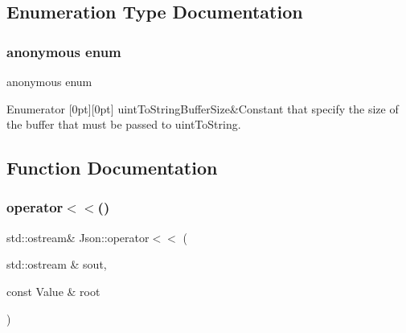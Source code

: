 \subsection{Enumeration Type Documentation}
\mbox{\label{namespace_json_a0c5f614b019f20b4598dcaec09d9e820}} 
\subsubsection{\texorpdfstring{anonymous enum}{anonymous enum}}
{\footnotesize\ttfamily anonymous enum}

\begin{DoxyEnumFields}{Enumerator}
[0pt][0pt]{}\mbox{\label{namespace_json_a0c5f614b019f20b4598dcaec09d9e820ae4f2008c7919f20d81286121d1374424}} 
uint\+To\+String\+Buffer\+Size&Constant that specify the size of the buffer that must be passed to uint\+To\+String. \\
\hline

\end{DoxyEnumFields}


\subsection{Function Documentation}
\mbox{\label{namespace_json_a170ed6561399621db20f291e33b64fb7}} 
\subsubsection{\texorpdfstring{operator$<$$<$()}{operator<<()}}
{\footnotesize\ttfamily std\+::ostream\& Json\+::operator$<$$<$ (\begin{DoxyParamCaption}\item[{std\+::ostream \&}]{sout,  }\item[{const Value \&}]{root }\end{DoxyParamCaption})}

\mbox{\label{namespace_json_a2434499c0c7f057890b32787c05fc4a3}} 
